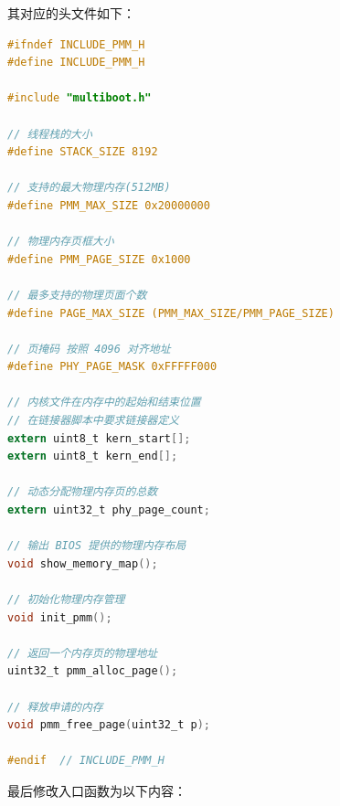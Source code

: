 \par 其对应的头文件如下：

\begin{lstlisting}[language = C, caption = include/pmm.h]
#ifndef INCLUDE_PMM_H
#define INCLUDE_PMM_H

#include "multiboot.h"

// 线程栈的大小
#define STACK_SIZE 8192

// 支持的最大物理内存(512MB)
#define PMM_MAX_SIZE 0x20000000

// 物理内存页框大小 
#define PMM_PAGE_SIZE 0x1000

// 最多支持的物理页面个数
#define PAGE_MAX_SIZE (PMM_MAX_SIZE/PMM_PAGE_SIZE)

// 页掩码 按照 4096 对齐地址
#define PHY_PAGE_MASK 0xFFFFF000

// 内核文件在内存中的起始和结束位置
// 在链接器脚本中要求链接器定义
extern uint8_t kern_start[];
extern uint8_t kern_end[];

// 动态分配物理内存页的总数
extern uint32_t phy_page_count;

// 输出 BIOS 提供的物理内存布局
void show_memory_map();

// 初始化物理内存管理
void init_pmm();

// 返回一个内存页的物理地址
uint32_t pmm_alloc_page();

// 释放申请的内存
void pmm_free_page(uint32_t p);

#endif 	// INCLUDE_PMM_H
\end{lstlisting}

\par 最后修改入口函数为以下内容：

